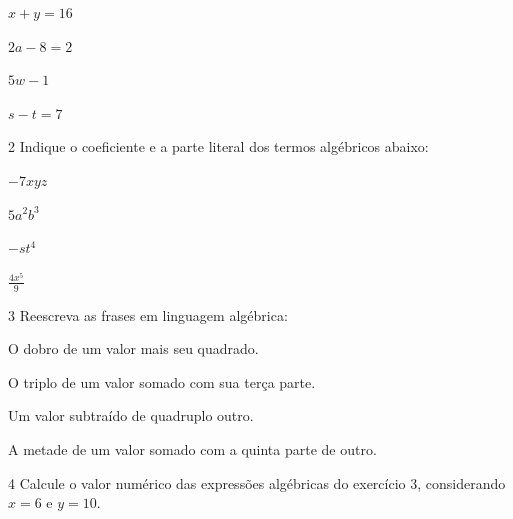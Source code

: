\begin{escolha}[itemsep=0pt]
\item $x + y = 16$  \\
\item $2a - 8 = 2$  \\
\item $5w - 1$  \\
\item $s - t = 7$ 
\end{escolha}

\num{2} Indique o coeficiente e a parte literal dos termos algébricos abaixo:

\begin{escolha}[itemsep=0pt]
\item $- 7xyz$  \\
\item $5a^2b^3$  \\
\item $- st^{4}$  \\
\item $\frac{4x^{5}}{9}$ 
\end{escolha}

\num{3} Reescreva as frases em linguagem algébrica:
\begin{escolha}[itemsep=0pt]
\item O dobro de um valor mais seu quadrado.  \\
\item O triplo de um valor somado com sua terça parte.  \\
\item Um valor subtraído de quadruplo outro.  \\
\item A metade de um valor somado com a quinta parte de outro. 
\end{escolha}

\num{4} Calcule o valor numérico das expressões algébricas do exercício 3,
considerando $x = 6$ e $y = 10$.

